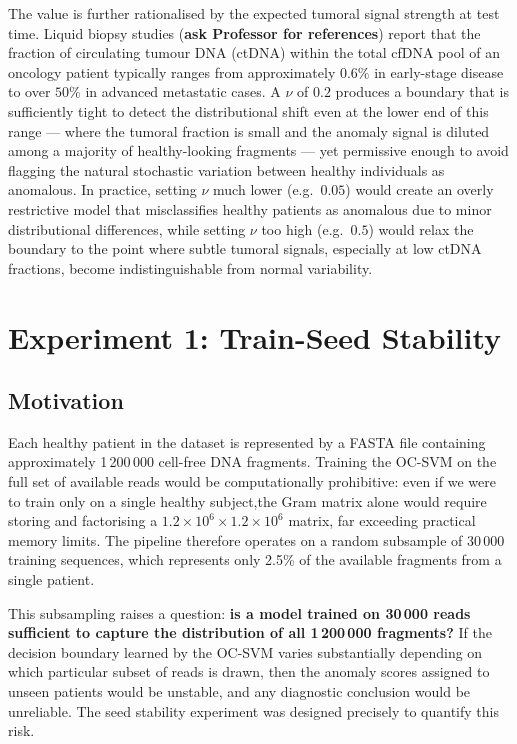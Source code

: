 The value is further rationalised by the expected tumoral signal strength at test time. Liquid biopsy studies (\textbf{ask Professor for references}) report that the fraction of circulating tumour DNA (ctDNA) within the total cfDNA pool of an oncology patient typically ranges from approximately $0.6\%$ in early-stage disease to over $50\%$ in advanced metastatic cases. A $\nu$ of $0.2$ produces a boundary that is sufficiently tight to detect the distributional shift even at the lower end of this range --- where the tumoral fraction is small and the anomaly signal is diluted among a majority of healthy-looking fragments --- yet permissive enough to avoid flagging the natural stochastic variation between healthy individuals as anomalous. In practice, setting $\nu$ much lower (e.g.\ $0.05$) would create an overly restrictive model that misclassifies healthy patients as anomalous due to minor distributional differences, while setting $\nu$ too high (e.g.\ $0.5$) would relax the boundary to the point where subtle tumoral signals, especially at low ctDNA fractions, become indistinguishable from normal variability.
\section{Experiment 1: Train-Seed Stability}\label{sec:seed-stability}

\subsection{Motivation}\label{sec:seed-motivation}

Each healthy patient in the dataset is represented by a FASTA file containing approximately 1\,200\,000 cell-free DNA fragments.
Training the OC-SVM on the full set of available reads would be computationally prohibitive: even if we were to train only on a single healthy subject,the Gram matrix alone would require storing and factorising a $1.2 \times 10^{6} \times 1.2 \times 10^{6}$ matrix, far exceeding practical memory limits.
The pipeline therefore operates on a random subsample of 30\,000 training sequences, which represents only 2.5\% of the available fragments from a single patient.

This subsampling raises a question: \textbf{is a model trained on 30\,000 reads sufficient to capture the distribution of all 1\,200\,000 fragments?}
If the decision boundary learned by the OC-SVM varies substantially depending on which particular subset of reads is drawn, then the anomaly scores assigned to unseen patients would be unstable, and any diagnostic conclusion would be unreliable.
The seed stability experiment was designed precisely to quantify this risk.


